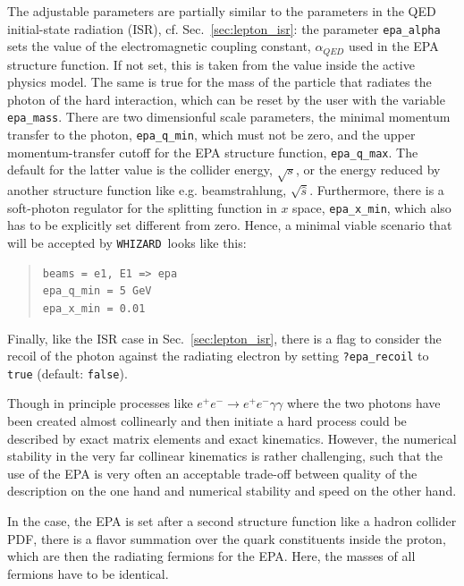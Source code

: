 \documentclass[12pt]{book}
\newcommand{\ttt}[1]{\texttt{#1}}
\newcommand{\whizard}{\ttt{WHIZARD}}
\begin{document}
The adjustable parameters are partially similar to the parameters in
the QED initial-state radiation (ISR), cf. Sec.~\ref{sec:lepton_isr}:
the parameter \ttt{epa\_alpha} sets the value of the electromagnetic
coupling constant, $\alpha_{QED}$ used in the EPA structure
function. If not set, this is taken from the value inside the active
physics model. The same is true for the mass of the particle that
radiates the photon of the hard interaction, which can be reset by the
user with the variable \ttt{epa\_mass}. There are two dimensionful
scale parameters, the minimal momentum transfer to the photon,
\ttt{epa\_q\_min}, which must not be zero, and the upper momentum-transfer
cutoff
for the EPA structure function, \ttt{epa\_q\_max}. The default for the
latter value is the collider energy, $\sqrt{s}$, or the energy reduced
by another structure function like e.g. beamstrahlung,
$\sqrt{\hat{s}}$. Furthermore, there is a soft-photon regulator for
the splitting function in $x$ space, \ttt{epa\_x\_min}, which also has
to be explicitly set different from zero. Hence, a minimal viable
scenario that will be accepted by \whizard\ looks like this:
\begin{quote}
\begin{footnotesize}
\begin{Verbatim}
beams = e1, E1 => epa
epa_q_min = 5 GeV
epa_x_min = 0.01
\end{Verbatim}
\end{footnotesize}
\end{quote}

Finally, like the ISR case in Sec.~\ref{sec:lepton_isr}, there is a
flag to consider the recoil of the photon against the radiating
electron by setting \ttt{?epa\_recoil} to \ttt{true} (default:
\ttt{false}).

Though in principle processes like $e^+ e^- \to e^+ e^- \gamma \gamma$
where the two photons have been created almost collinearly and then
initiate a hard process could be described by exact matrix elements
and exact kinematics. However, the numerical stability in the very far
collinear kinematics is rather challenging, such that the use of the
EPA is very often an acceptable trade-off between quality of the
description on the one hand and numerical stability and speed on the
other hand.

In the case, the EPA is set after a second structure function like a
hadron collider PDF, there is a flavor summation over the quark
constituents inside the proton, which are then the radiating fermions
for the EPA. Here, the masses of all fermions have to be identical.
\end{document}
